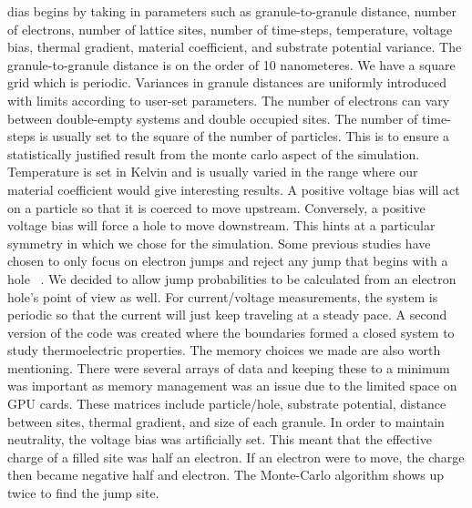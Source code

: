 {\sc dias} begins by taking in parameters such as granule-to-granule distance, number of electrons, number of lattice sites, number of time-steps, temperature, voltage bias, thermal gradient, material coefficient, and substrate potential variance. The granule-to-granule distance is on the order of 10 nanometeres. We have a square grid which is periodic. Variances in granule distances are uniformly introduced with limits according to user-set parameters. The number of electrons can vary between double-empty systems and double occupied sites. The number of time-steps is usually set to the square of the number of particles. This is to ensure a statistically justified result from the monte carlo aspect of the simulation. Temperature is set in Kelvin and is usually varied in the range where our material coefficient would give interesting results.  A positive voltage bias will act on a particle so that it is coerced to move upstream. Conversely, a positive voltage bias will force a hole to move downstream. This hints at a particular symmetry in which we chose for the simulation. Some previous studies have chosen to only focus on electron jumps and reject any jump that begins with a hole ~\cite{Ferrero14}. We decided to allow jump probabilities to be calculated from an electron hole's point of view as well. For current/voltage measurements, the system is periodic so that the current will just keep traveling at a steady pace. A second version of the code was created where the boundaries formed a closed system to study thermoelectric properties. The memory choices we made are also worth mentioning. There were several arrays of data and keeping these to a minimum was important as memory management was an issue due to the limited space on GPU cards. These matrices include particle/hole, substrate potential, distance between sites, thermal gradient, and size of each granule. In order to maintain neutrality, the voltage bias was artificially set. This meant that the effective charge of a filled site was half an electron. If an electron were to move, the charge then became negative half and electron. The Monte-Carlo algorithm shows up twice to find the jump site.  

